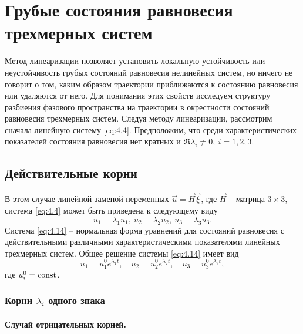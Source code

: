 \section{Грубые состояния равновесия трехмерных систем}%
\label{sec:4.4}

Метод линеаризации позволяет установить локальную устойчивость или
неустойчивость грубых состояний равновесия нелинейных систем, но ничего не
говорит о том, каким образом траектории приближаются к состоянию
равновесия или удаляются от него. Для понимания этих свойств исследуем
структуру разбиения фазового пространства на траектории в окрестности
состояний равновесия трехмерных систем. Следуя методу линеаризации,
рассмотрим сначала линейную систему \eqref{eq:4.4}. Предположим, что среди
характеристических показателей состояния равновесия нет кратных и
$\Re \lambda_i \neq 0, ~ i = 1,2,3.$

\subsection{Действительные корни}%
\label{sub:4.4.1}

В этом случае линейной заменой переменных $\vec u = \vec H \vec \xi$, где $\vec H$ -- матрица $3 \times 3$, система \eqref{eq:4.4} может быть приведена к следующему виду
\begin{equation}
        \label{eq:4.14}
        \dot u_1 = \lambda_1 u_1, ~ \dot u_2 = \lambda_2 u_2,~ \dot u_3 = \lambda_3 u_3.
\end{equation}
Система \eqref{eq:4.14} -- нормальная форма уравнений для состояний равновесия с действительными различными характеристическими показателями линейных трехмерных систем. Общее решение системы \eqref{eq:4.14} имеет вид 
\begin{equation}
        \label{eq:4.15}
        u_1 = u_1^{0} e^{\lambda_1 t}, \quad u_2=u_2^{0} e^{\lambda_2t}, \quad u_3 = u_3^{0} e^{\lambda_3 t},
\end{equation}
где $u_i^0=\textrm{const}$.

\subsubsection{Корни $\lambda_i $ одного знака}%
\label{ssub:4.4.1a}

\paragraph{Случай отрицательных корней.}%
\label{par:sluchai_otritsatel_nykh_kornei_}

